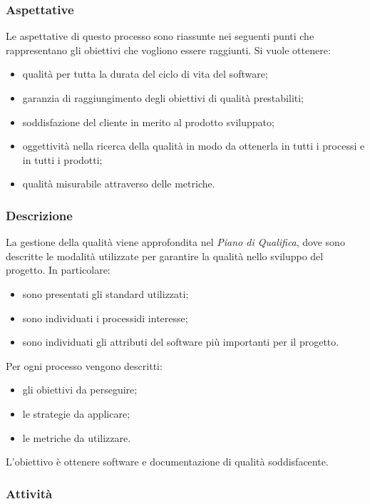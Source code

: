 \subsubsection{Aspettative}
Le aspettative di questo processo sono riassunte nei seguenti punti che rappresentano gli obiettivi che vogliono essere raggiunti. Si vuole ottenere: \begin{itemize}
\item qualità per tutta la durata del ciclo di vita del software;
\item garanzia di raggiungimento degli obiettivi di qualità prestabiliti;
\item soddisfazione del cliente in merito al prodotto sviluppato;
\item oggettività nella ricerca della qualità in modo da ottenerla in tutti i processi e in tutti i prodotti;
\item qualità misurabile attraverso delle metriche.
\end{itemize}

\subsubsection{Descrizione}
La gestione della qualità viene approfondita nel \textit{Piano di Qualifica}, dove sono descritte le modalità utilizzate per garantire la qualità nello sviluppo del progetto. In particolare: \begin{itemize}
\item sono presentati gli standard utilizzati;
\item sono individuati i processi\glo di interesse;
\item sono individuati gli attributi del software più importanti per il progetto.
\end{itemize}
Per ogni processo vengono descritti: \begin{itemize}
\item gli obiettivi da perseguire;
\item le strategie da applicare;
\item le metriche da utilizzare.
\end{itemize}
L'obiettivo è ottenere software e documentazione di qualità soddisfacente.

\subsubsection{Attività}
